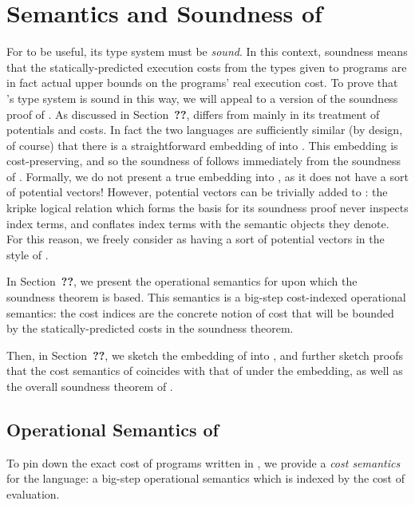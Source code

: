 \section{Semantics and Soundness of \dlambdaamor}
For \dlambdaamor to be useful, its type system must be \textit{sound}. In this context, soundness means that the statically-predicted execution costs from the types given to programs are in fact actual upper bounds on the programs' real execution cost. To prove that \dlambdaamor's type system is sound in this way, we will appeal to a version of the soundness proof of \lambdaamorminus. As discussed in Section~\textbf{??}, \lambdaamorminus differs from \dlambdaamor mainly in its treatment of potentials and costs. In fact the two languages are sufficiently similar (by design, of course) that there is a straightforward embedding of \dlambdaamor into \lambdaamorminus. This embedding is cost-preserving, and so the soundness of \dlambdaamor follows immediately from the soundness of \lambdaamorminus. Formally, we do not present a true embedding into \lambdaamorminus, as it does not have a sort of potential vectors! However, potential vectors can be trivially added to \lambdaamorminus: the kripke logical relation which forms the basis for its soundness proof never inspects index terms, and conflates index terms with the semantic objects they denote. For this reason, we freely consider \lambdaamorminus as having a sort of potential vectors in the style of \dlambdaamor.

In Section~\textbf{??}, we present the operational semantics for \dlambdaamor upon which the soundness theorem is based. This semantics is a big-step cost-indexed operational semantics: the cost indices are the concrete notion of cost that will be bounded by the statically-predicted costs in the soundness theorem.

Then, in Section~\textbf{??}, we sketch the embedding of \dlambdaamor into \lambdaamorminus, and further sketch proofs that the cost semantics of \dlambdaamor coincides with that of \lambdaamorminus under the embedding, as well as the overall soundness theorem of \dlambdaamor.


\subsection{Operational Semantics of \dlambdaamor}
To pin down the exact cost of programs written in \dlambdaamor, we provide a \textit{cost semantics} for the language: a big-step operational semantics which is indexed by the cost of evaluation.

